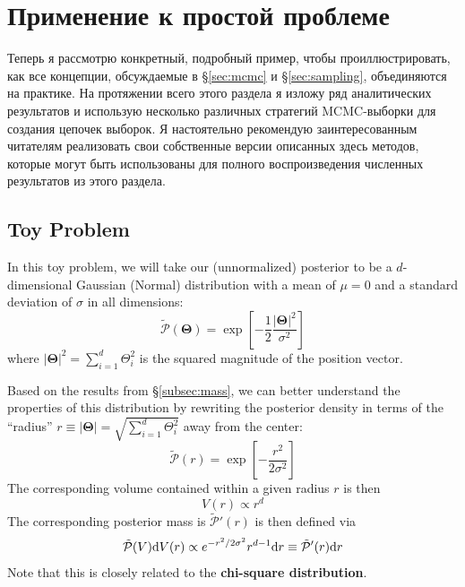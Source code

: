 \documentclass[12pt, titlepage]{article}
\newcommand{\deriv}{\ensuremath{{\rm d}}}  %
\newcommand{\params}{\ensuremath{\boldsymbol\Theta}}
\newcommand{\posterior}{\ensuremath{\mathcal{P}}}
\begin{document}
\section{Применение к простой проблеме} \label{sec:example}

Теперь я рассмотрю конкретный, подробный пример, чтобы проиллюстрировать, как все концепции, обсуждаемые в \S\ref{sec:mcmc} и \S\ref{sec:sampling}, объединяются на практике. На протяжении всего этого раздела я изложу ряд аналитических результатов и использую несколько различных стратегий MCMC-выборки для создания цепочек выборок. Я настоятельно рекомендую заинтересованным читателям реализовать свои собственные версии описанных здесь методов, которые могут быть использованы для полного воспроизведения численных результатов из этого раздела.

\subsection{Toy Problem} \label{subsec:analytic}

In this toy problem, we will take our (unnormalized) 
posterior to be a $d$-dimensional 
Gaussian (Normal) distribution with a mean
of $\mu = 0$ and a standard deviation of $\sigma$
in all dimensions:
\begin{equation}
    \tilde{\posterior}(\params) 
    = \exp\left[-\frac{1}{2}\frac{|\params|^2}{\sigma^2}\right]
\end{equation}
where $|\params|^2 = \sum_{i=1}^{d} \Theta_i^2$ is the squared magnitude
of the position vector.

Based on the results from \S\ref{subsec:mass}, 
we can better understand the properties of this distribution by
rewriting the posterior density
in terms of the ``radius''
$r \equiv | \params | = \sqrt{\sum_{i=1}^{d} \Theta_i^2}$
away from the center:
\begin{equation}
    \tilde{\posterior}(r) = \exp\left[-\frac{r^2}{2\sigma^2}\right]
\end{equation}
The corresponding volume contained within a given radius $r$ is then
\begin{equation}
    V(r) \propto r^d
\end{equation}
The corresponding posterior mass is $\tilde{\posterior}'(r)$
is then defined via
\begin{align}
    \tilde{\posterior}(V) \deriv V(r)
    \propto e^{-r^2/2\sigma^2} r^{d-1} \deriv r \nonumber
    \equiv \tilde{\posterior}'(r) \deriv r
\end{align}
Note that this is closely related
to the \textbf{chi-square distribution}.
\end{document}
